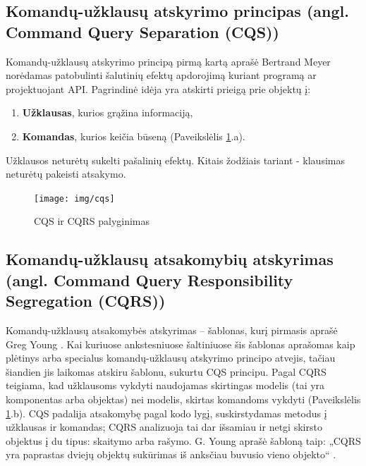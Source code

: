 \subsection{Komandų-užklausų atskyrimo principas (angl. Command Query Separation (CQS))}

Komandų-užklausų atskyrimo principą pirmą kartą aprašė Bertrand Meyer \cite{Meyer:1988:OSC:534929} norėdamas patobulinti šalutinių efektų apdorojimą kuriant programą ar projektuojant API. Pagrindinė idėja yra atskirti prieigą prie objektų į:

\begin{enumerate}

  \item \textbf{Užklausas}, kurios grąžina informaciją,

  \item \textbf{Komandas}, kurios keičia būseną (Paveikslėlis \ref{img:cqs}.a).

\end{enumerate}

Užklausos neturėtų sukelti pašalinių efektų. Kitais žodžiais tariant - klausimas neturėtų pakeisti atsakymo.

\begin{figure}[H]
    \centering
    \texttt{[image: img/cqs]}
    \caption{CQS ir CQRS palyginimas}
    \label{img:cqs}
\end{figure}

\subsection{Komandų-užklausų atsakomybių atskyrimas (angl. Command Query Responsibility Segregation (CQRS))}

Komandų-užklausų atsakomybės atskyrimas – šablonas, kurį pirmasis aprašė Greg Young \cite{Young:CQRS2013}. Kai kuriuose ankstesniuose šaltiniuose šis šablonas aprašomas kaip plėtinys arba specialus komandų-užklausų atskyrimo principo atvejis, tačiau šiandien jis laikomas atskiru šablonu, sukurtu CQS principu. Pagal CQRS teigiama, kad užklausoms vykdyti naudojamas skirtingas modelis (tai yra komponentas arba objektas) nei modelis, skirtas komandoms vykdyti (Paveikslėlis \ref{img:cqs}.b). CQS padalija atsakomybę pagal kodo lygį, suskirstydamas metodus į užklausas ir komandas; CQRS analizuoja tai dar išsamiau ir netgi skirsto objektus į du tipus: skaitymo arba rašymo. G. Young aprašė šabloną taip: „CQRS yra paprastas dviejų objektų sukūrimas iš anksčiau buvusio vieno objekto“ \cite{Young:CQRS2010}.

